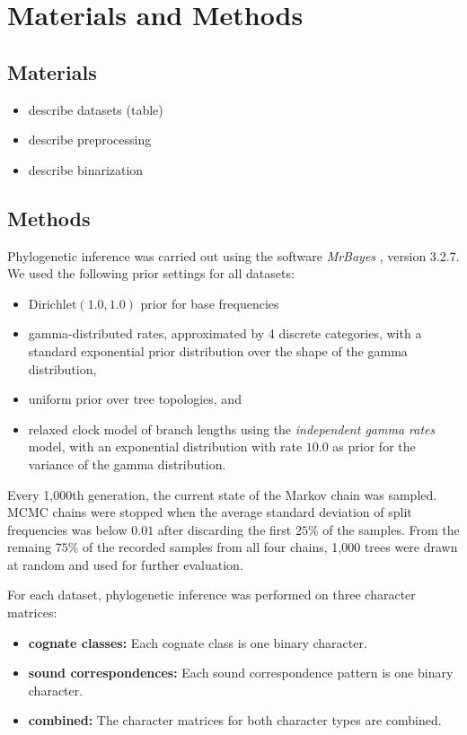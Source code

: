 \documentclass[10pt, a4paper]{article}
\begin{document}
\section{Materials and Methods}

\subsection{Materials}

\begin{itemize}
  \item describe datasets (table)
  \item describe preprocessing
  \item describe binarization
\end{itemize}


\subsection{Methods}

Phylogenetic inference was carried out using the software \emph{MrBayes} \citep{mrbayes3}, version 3.2.7. We used the following prior settings for all datasets:
\begin{itemize}
  \item \(\mathrm{Dirichlet}(1.0, 1.0)\) prior for base frequencies
  \item gamma-distributed rates, approximated by 4 discrete categories, with a standard exponential prior distribution over the shape of the gamma distribution,
  \item uniform prior over tree topologies, and
  \item relaxed clock model of branch lengths using the \emph{independent gamma rates} model, with an exponential distribution with rate \(10.0\) as prior for the variance of the gamma distribution.
\end{itemize}

Every 1,000th generation, the current state of the Markov chain was sampled. MCMC chains were stopped when the average standard deviation of split frequencies was below \(0.01\) after discarding the first \(25\% \) of the samples.  From the remaing \(75\% \) of the recorded samples from all four chains, 1,000 trees were drawn at random and used for further evaluation.

For each dataset, phylogenetic inference was performed on three character matrices:
\begin{itemize}
  \item \textbf{cognate classes:} Each cognate class is one binary character.
  \item \textbf{sound correspondences:} Each sound correspondence pattern is one binary character.
  \item \textbf{combined:} The character matrices for both character types are combined.
\end{itemize}
\end{document}
